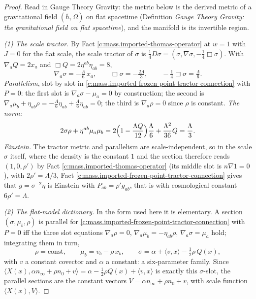 \documentclass[11pt]{article}
\theoremstyle{definition}
\theoremstyle{plain}
\providecommand{\hb}{}\renewcommand{\hb}{\bar{h}}
\providecommand{\ip}{}\renewcommand{\ip}[2]{\langle #1, #2\rangle}
\begin{document}
\begin{proof}
Read in Gauge Theory Gravity: the metric below is the derived metric of a gravitational field $(\hb, \Omega)$ on flat spacetime (Definition \emph{Gauge Theory Gravity: the gravitational field on flat spacetime}), and the manifold is its invertible region.

\emph{(1) The scale tractor.} By Fact \ref{c:mass.imported-thomas-operator} at $w = 1$ with $J = 0$ for the flat scale, the scale tractor of $\sigma$ is $\tfrac14 D\sigma = (\sigma, \nabla\sigma, -\tfrac14\Box\sigma)$. With $\nabla_{a}Q = 2x_{a}$ and $\Box Q = 2\eta^{ab}\eta_{ab} = 8$,
\[
\nabla_{a}\sigma = -\tfrac{\Lambda}{6}\,x_{a}, \qquad \Box\sigma = -\tfrac{2\Lambda}{3}, \qquad -\tfrac14\Box\sigma = \tfrac{\Lambda}{6}.
\]
\emph{Parallelism}, slot by slot in \ref{c:mass.imported-frozen-point-tractor-connection} with $P = 0$: the first slot is $\nabla_{a}\sigma - \mu_{a} = 0$ by construction; the second is $\nabla_{a}\mu_{b} + \eta_{ab}\rho = -\tfrac{\Lambda}{6}\eta_{ab} + \tfrac{\Lambda}{6}\eta_{ab} = 0$; the third is $\nabla_{a}\rho = 0$ since $\rho$ is constant. \emph{The norm:}
\[
2\sigma\rho + \eta^{ab}\mu_{a}\mu_{b} = 2\Bigl(1 - \frac{\Lambda Q}{12}\Bigr)\frac{\Lambda}{6} + \frac{\Lambda^{2}}{36}Q = \frac{\Lambda}{3}.
\]
\emph{Einstein.} The tractor metric and parallelism are scale-independent, so in the scale $\sigma$ itself, where the density is the constant $1$ and the section therefore reads $(1, 0, \rho')$ by Fact \ref{c:mass.imported-thomas-operator} (its middle slot is $n\nabla 1 = 0$), with $2\rho' = \Lambda/3$, Fact \ref{c:mass.imported-frozen-point-tractor-connection} gives that $g = \sigma^{-2}\eta$ is Einstein with $P_{ab} = \rho' g_{ab}$, that is with cosmological constant $6\rho' = \Lambda$.

\emph{(2) The flat-model dictionary.} In the form used here it is elementary. A section $(\sigma, \mu_{b}, \rho)$ is parallel for \ref{c:mass.imported-frozen-point-tractor-connection} with $P = 0$ iff the three slot equations $\nabla_{a}\rho = 0$, $\nabla_{a}\mu_{b} = -\eta_{ab}\rho$, $\nabla_{a}\sigma = \mu_{a}$ hold; integrating them in turn,
\[
\rho = \text{const}, \qquad \mu_{b} = v_{b} - \rho\, x_{b}, \qquad \sigma = \alpha + \ip{v}{x} - \tfrac12\rho\, Q(x),
\]
with $v$ a constant covector and $\alpha$ a constant: a six-parameter family. Since $\ip{X(x)}{\alpha n_{\infty} + \rho n_{0} + v} = \alpha - \tfrac12\rho Q(x) + \ip{v}{x}$ is exactly this $\sigma$-slot, the parallel sections are the constant vectors $V = \alpha n_{\infty} + \rho n_{0} + v$, with scale function $\ip{X(x)}{V}$.


\end{proof}
\end{document}
